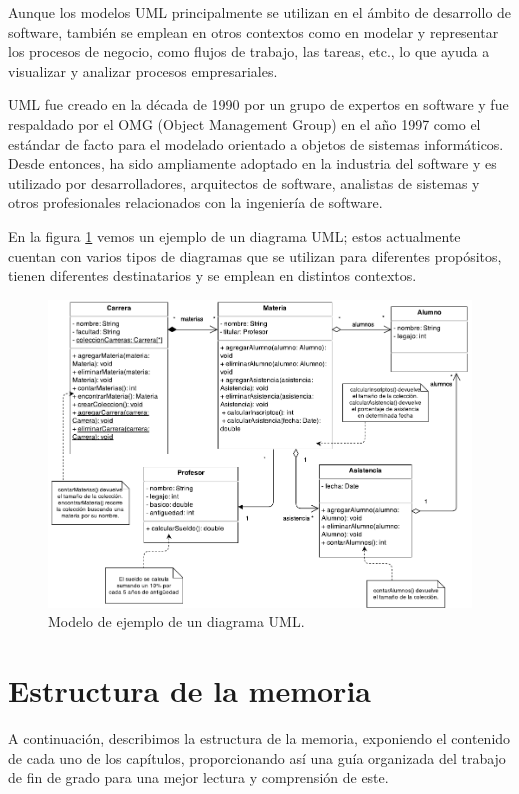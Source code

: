 \documentclass[a4paper, 12pt]{book}
\begin{document}
Aunque los modelos UML principalmente se utilizan en el ámbito de desarrollo de software, también se emplean en otros contextos como en modelar y representar los procesos de negocio, como flujos de trabajo, las tareas, etc., lo que ayuda a visualizar y analizar procesos empresariales.


UML fue creado en la década de 1990 por un grupo de expertos en software y fue respaldado por el OMG (Object Management Group) en el año 1997 como el estándar de facto para el modelado orientado a objetos de sistemas informáticos. 
Desde entonces, ha sido ampliamente adoptado en la industria del software y es utilizado por desarrolladores, arquitectos de software, analistas de sistemas y otros profesionales relacionados con la ingeniería de software. 


En la figura \ref{fig:diagrama-uml} vemos un ejemplo de un diagrama UML; estos actualmente cuentan con varios tipos de diagramas que se utilizan para diferentes propósitos, tienen diferentes destinatarios y se emplean en distintos contextos.


\begin{figure}
  \centering
  \includegraphics[width=16cm, keepaspectratio]{img/Diagrama-uml.png}
  \caption{Modelo de ejemplo de un diagrama UML.}\label{fig:diagrama-uml}
\end{figure}


\section{Estructura de la memoria}
\label{sec:estructura}

A continuación, describimos la estructura de la memoria, exponiendo el contenido de cada uno de los capítulos, proporcionando así una guía organizada del trabajo de fin de grado para una mejor lectura y comprensión de este.
\end{document}
